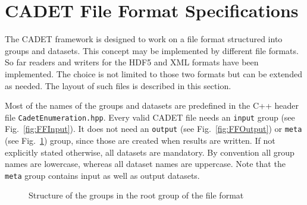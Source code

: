 %  
%                                      
%  

\section{CADET File Format Specifications}
The CADET framework is designed to work on a file format structured into groups and datasets. This
concept may be implemented by different file formats.
So far readers and writers for the HDF5 and XML formats have been implemented. The choice is not
limited to those two formats but can be extended as needed.
The layout of such files is described in this section. 

Most of the names of the groups and datasets are predefined in the C++ header file
\texttt{CadetEnumeration.hpp}.
Every valid CADET file needs an \texttt{input} group (see Fig.~\ref{fig:FFInput}). 
It does not need an \texttt{output} (see Fig.~\ref{fig:FFOutput}) or \texttt{meta} (see Fig.~\ref{fig:FFRoot}) group,
since those are created when results are written. If not explicitly stated otherwise, all datasets
are mandatory. By convention all group names are lowercase, whereas all dataset names are uppercase.
Note that the \texttt{meta} group contains input as well as output datasets.

\begin{figure}[!ht]
\centering
{}
\caption{\label{fig:FFRoot}Structure of the groups in the root group of the file format}
\end{figure}

